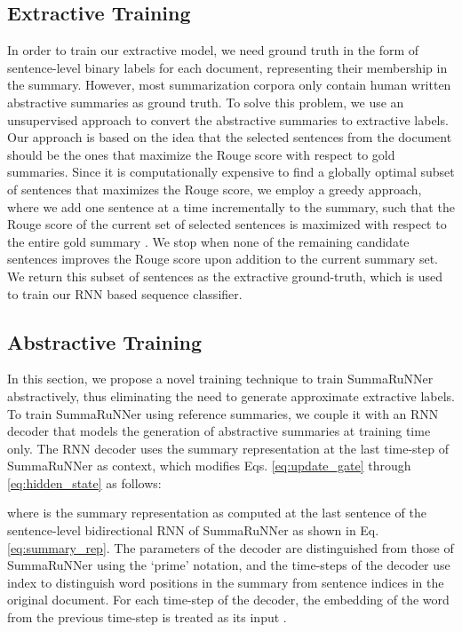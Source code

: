 \documentclass[letterpaper]{article}
\begin{document}
\subsection{Extractive Training}\label{sec:extractive_training}
 In order to train our extractive model, we need ground truth in the form of sentence-level binary labels for each document, representing their membership in the summary. However, most summarization corpora only contain human written abstractive summaries as ground truth. To solve this problem, we use an unsupervised approach to convert the abstractive summaries to extractive labels. Our approach is based on the idea that the selected sentences from the document should be the ones that maximize the Rouge score with respect to gold summaries. Since it is computationally expensive to find a globally optimal subset of sentences that maximizes the Rouge score, we employ a greedy approach, where we add one sentence at a time incrementally to the summary, such that the Rouge score of the current set of selected sentences is maximized with respect to the entire gold summary . 
We stop when none of the remaining candidate sentences improves the Rouge score upon addition to the current summary set. We return this subset of sentences as the extractive ground-truth, which is used to train our RNN based sequence classifier. 

\subsection{\bf Abstractive Training}\label{sec:abstractive_training}
In this section, we propose a novel training technique to train SummaRuNNer abstractively, thus eliminating the need to generate approximate extractive labels. To train SummaRuNNer using reference summaries, we couple it with an RNN decoder that models the generation of abstractive summaries at training time only. The RNN decoder uses the summary representation at the last time-step of SummaRuNNer as context, which modifies Eqs. \ref{eq:update_gate} through \ref{eq:hidden_state} as follows:

where  is the summary representation as computed at the last sentence of the sentence-level bidirectional RNN of SummaRuNNer as shown in Eq. \ref{eq:summary_rep}. The parameters of the decoder are distinguished from those of SummaRuNNer using the `prime' notation, and the time-steps of the decoder use index  to distinguish word positions in the summary from sentence indices  in the original document. For each time-step of the decoder, the embedding of the word from the previous time-step is treated as its input .
\end{document}
